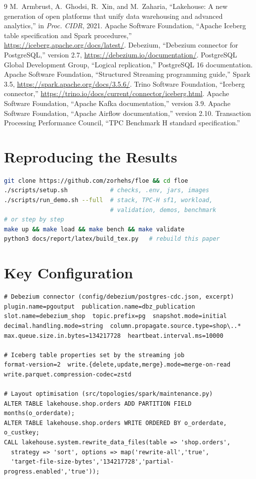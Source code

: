 \documentclass[conference,a4paper]{IEEEtran}
\begin{document}
\begin{thebibliography}{9}
 M.~Armbrust, A.~Ghodsi, R.~Xin, and M.~Zaharia, ``Lakehouse: A new generation of open platforms
that unify data warehousing and advanced analytics,'' in \emph{Proc. CIDR}, 2021.
 Apache Software Foundation, ``Apache Iceberg table specification and Spark procedures,''
\url{https://iceberg.apache.org/docs/latest/}.
 Debezium, ``Debezium connector for PostgreSQL,'' version 2.7, \url{https://debezium.io/documentation/}.
 PostgreSQL Global Development Group, ``Logical replication,'' PostgreSQL 16 documentation.
 Apache Software Foundation, ``Structured Streaming programming guide,'' Spark 3.5,
\url{https://spark.apache.org/docs/3.5.6/}.
 Trino Software Foundation, ``Iceberg connector,'' \url{https://trino.io/docs/current/connector/iceberg.html}.
 Apache Software Foundation, ``Apache Kafka documentation,'' version 3.9.
 Apache Software Foundation, ``Apache Airflow documentation,'' version 2.10.
 Transaction Processing Performance Council, ``TPC Benchmark H standard specification.''
\end{thebibliography}

\appendices
\section{Reproducing the Results}
\begin{lstlisting}[language=bash]
git clone https://github.com/zorhehs/floe && cd floe
./scripts/setup.sh            # checks, .env, jars, images
./scripts/run_demo.sh --full  # stack, TPC-H sf1, workload,
                              # validation, demos, benchmark
# or step by step
make up && make load && make bench && make validate
python3 docs/report/latex/build_tex.py   # rebuild this paper
\end{lstlisting}

\section{Key Configuration}
\begin{lstlisting}
# Debezium connector (config/debezium/postgres-cdc.json, excerpt)
plugin.name=pgoutput  publication.name=dbz_publication
slot.name=debezium_shop  topic.prefix=pg  snapshot.mode=initial
decimal.handling.mode=string  column.propagate.source.type=shop\..*
max.queue.size.in.bytes=134217728  heartbeat.interval.ms=10000

# Iceberg table properties set by the streaming job
format-version=2  write.{delete,update,merge}.mode=merge-on-read
write.parquet.compression-codec=zstd

# Layout optimisation (src/topologies/spark/maintenance.py)
ALTER TABLE lakehouse.shop.orders ADD PARTITION FIELD months(o_orderdate);
ALTER TABLE lakehouse.shop.orders WRITE ORDERED BY o_orderdate, o_custkey;
CALL lakehouse.system.rewrite_data_files(table => 'shop.orders',
  strategy => 'sort', options => map('rewrite-all','true',
  'target-file-size-bytes','134217728','partial-progress.enabled','true'));
\end{lstlisting}
\end{document}
